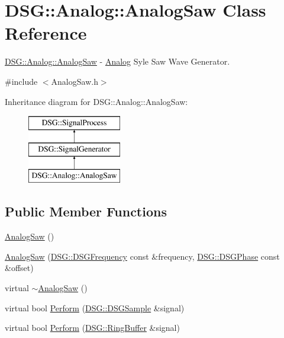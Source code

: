 \hypertarget{class_d_s_g_1_1_analog_1_1_analog_saw}{\section{D\+S\+G\+:\+:Analog\+:\+:Analog\+Saw Class Reference}
\label{class_d_s_g_1_1_analog_1_1_analog_saw}
}


\hyperlink{class_d_s_g_1_1_analog_1_1_analog_saw}{D\+S\+G\+::\+Analog\+::\+Analog\+Saw} -\/ \hyperlink{namespace_d_s_g_1_1_analog}{Analog} Syle Saw Wave Generator.  




{\ttfamily \#include $<$Analog\+Saw.\+h$>$}

Inheritance diagram for D\+S\+G\+:\+:Analog\+:\+:Analog\+Saw\+:\begin{figure}[H]
\begin{center}
\leavevmode
\includegraphics[height=3.000000cm]{class_d_s_g_1_1_analog_1_1_analog_saw}
\end{center}
\end{figure}
\subsection*{Public Member Functions}
\begin{DoxyCompactItemize}
\item 
\hyperlink{class_d_s_g_1_1_analog_1_1_analog_saw_abcb0b997be32413da0d14b93aeeb9c17}{Analog\+Saw} ()
\item 
\hyperlink{class_d_s_g_1_1_analog_1_1_analog_saw_ad110da0b337948fb70ecdfad7dbb5ddf}{Analog\+Saw} (\hyperlink{namespace_d_s_g_a4315a061386fa1014fda09b15d3a6973}{D\+S\+G\+::\+D\+S\+G\+Frequency} const \&frequency, \hyperlink{namespace_d_s_g_a44431ce1eb0a7300efdd207bc879e52c}{D\+S\+G\+::\+D\+S\+G\+Phase} const \&offset)
\item 
virtual \hyperlink{class_d_s_g_1_1_analog_1_1_analog_saw_a42a5fe22e0c3b9d1bd3996fe5bbd24ba}{$\sim$\+Analog\+Saw} ()
\item 
virtual bool \hyperlink{class_d_s_g_1_1_analog_1_1_analog_saw_a8d36e77c09ba84128e786c7bb14cddda}{Perform} (\hyperlink{namespace_d_s_g_ac39a94cd27ebcd9c1e7502d0c624894a}{D\+S\+G\+::\+D\+S\+G\+Sample} \&signal)
\item 
virtual bool \hyperlink{class_d_s_g_1_1_analog_1_1_analog_saw_a38f091059d924c9141fee3e27522e7e1}{Perform} (\hyperlink{class_d_s_g_1_1_ring_buffer}{D\+S\+G\+::\+Ring\+Buffer} \&signal)
\end{DoxyCompactItemize}

